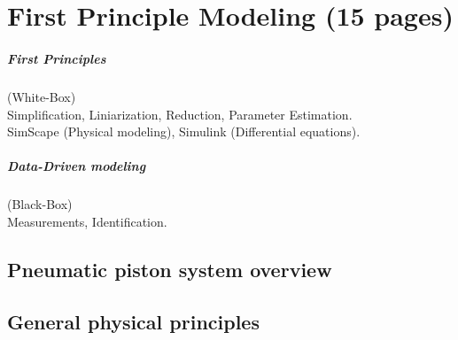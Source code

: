 %                            

\chapter{First Principle Modeling (15 pages)}
\paragraph{First Principles} (White-Box) \\
Simplification, Liniarization, Reduction, Parameter Estimation. \\
SimScape (Physical modeling), Simulink (Differential equations).

\paragraph{Data-Driven modeling}(Black-Box) \\ %
Measurements, Identification.


\section{Pneumatic piston system overview}







\section{General physical principles}
